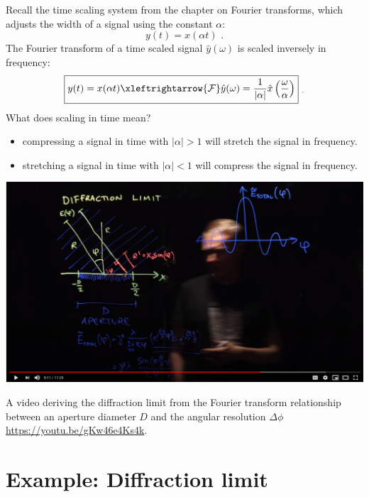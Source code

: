Recall the time scaling system from the chapter on Fourier transforms,
which adjusts the width of a signal using the constant $\alpha$:
\begin{equation}
y(t) = x(\alpha t) \,\,.
\end{equation}
The Fourier transform of a time scaled signal $\hat{y}(\omega)$ is
scaled inversely in frequency:
\begin{align}
\boxed{
y(t) = x(\alpha t) \xleftrightarrow{\mathcal{F}} \hat{y}(\omega) = \frac{1}{|\alpha|}\hat{x}\left(\frac{\omega}{\alpha}\right)
} \,\, _.
\end{align}
What does scaling in time mean?
\begin{itemize}
\item compressing a signal in time with $|\alpha|>1$ will stretch the signal in frequency.
\item stretching a signal in time with $|\alpha|<1$ will compress the signal in frequency. 
\end{itemize}

\begin{marginfigure}[-6cm]
  \begin{center}
    \includegraphics[width=\textwidth]{ch14/figures/video0.jpg}
  \end{center}
  \caption{A video deriving the diffraction limit from the Fourier transform relationship between an aperture diameter $D$ and the angular resolution $\Delta \phi$ \url{https://youtu.be/gKw46e4Ks4k}.}
\end{marginfigure}


\section{Example: Diffraction limit}


